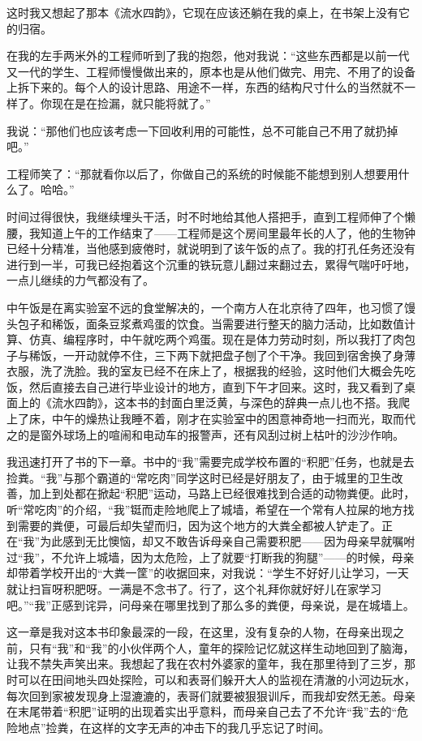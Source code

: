 \documentclass[openany,scheme = chinese, linespread = 1.5]{ctexbook}
\begin{document}
这时我又想起了那本《流水四韵》，它现在应该还躺在我的桌上，在书架上没有它的归宿。

在我的左手两米外的工程师听到了我的抱怨，他对我说：“这些东西都是以前一代又一代的学生、工程师慢慢做出来的，原本也是从他们做完、用完、不用了的设备上拆下来的。每个人的设计思路、用途不一样，东西的结构尺寸什么的当然就不一样了。你现在是在捡漏，就只能将就了。”

我说：“那他们也应该考虑一下回收利用的可能性，总不可能自己不用了就扔掉吧。”

工程师笑了：“那就看你以后了，你做自己的系统的时候能不能想到别人想要用什么了。哈哈。”

时间过得很快，我继续埋头干活，时不时地给其他人搭把手，直到工程师伸了个懒腰，我知道上午的工作结束了——工程师是这个房间里最年长的人了，他的生物钟已经十分精准，当他感到疲倦时，就说明到了该午饭的点了。我的打孔任务还没有进行到一半，可我已经抱着这个沉重的铁玩意儿翻过来翻过去，累得气喘吁吁地，一点儿继续的力气都没有了。

中午饭是在离实验室不远的食堂解决的，一个南方人在北京待了四年，也习惯了馒头包子和稀饭，面条豆浆煮鸡蛋的饮食。当需要进行整天的脑力活动，比如数值计算、仿真、编程序时，中午就吃两个鸡蛋。现在是体力劳动时刻，所以我打了肉包子与稀饭，一开动就停不住，三下两下就把盘子刨了个干净。我回到宿舍换了身薄衣服，洗了洗脸。我的室友已经不在床上了，根据我的经验，这时他们大概会先吃饭，然后直接去自己进行毕业设计的地方，直到下午才回来。这时，我又看到了桌面上的《流水四韵》，这本书的封面白里泛黄，与深色的辞典一点儿也不搭。我爬上了床，中午的燥热让我睡不着，刚才在实验室中的困意神奇地一扫而光，取而代之的是窗外球场上的喧闹和电动车的报警声，还有风刮过树上枯叶的沙沙作响。

我迅速打开了书的下一章。书中的“我”需要完成学校布置的“积肥”任务，也就是去捡粪。“我”与那个霸道的“常吃肉”同学这时已经是好朋友了，由于城里的卫生改善，加上到处都在掀起“积肥”运动，马路上已经很难找到合适的动物粪便。此时，听“常吃肉”的介绍，“我”铤而走险地爬上了城墙，希望在一个常有人拉屎的地方找到需要的粪便，可最后却失望而归，因为这个地方的大粪全都被人铲走了。正在“我”为此感到无比懊恼，却又不敢告诉母亲自己需要积肥——因为母亲早就嘱咐过“我”，不允许上城墙，因为太危险，上了就要“打断我的狗腿”——的时候，母亲却带着学校开出的“大粪一筐”的收据回来，对我说：“学生不好好儿让学习，一天就让扫盲呀积肥呀。一满是不念书了。行了，这个礼拜你就好好儿在家学习吧。”“我”正感到诧异，问母亲在哪里找到了那么多的粪便，母亲说，是在城墙上。

这一章是我对这本书印象最深的一段，在这里，没有复杂的人物，在母亲出现之前，只有“我”和“我”的小伙伴两个人，童年的探险记忆就这样生动地回到了脑海，让我不禁失声笑出来。我想起了我在农村外婆家的童年，我在那里待到了三岁，那时可以在田间地头四处探险，可以和表哥们躲开大人的监视在清澈的小河边玩水，每次回到家被发现身上湿漉漉的，表哥们就要被狠狠训斥，而我却安然无恙。母亲在末尾带着“积肥”证明的出现着实出乎意料，而母亲自己去了不允许“我”去的“危险地点”捡粪，在这样的文字无声的冲击下的我几乎忘记了时间。
\end{document}
